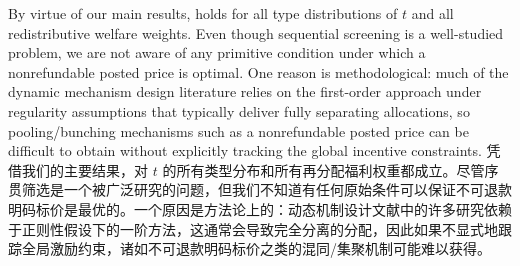 \documentclass[12pt,letterpaper]{article}
\newenvironment{original}{\color{black}\noindent}{}
\newenvironment{translation}{\color{blue}\noindent}{}
\theoremstyle{plain}
\theoremstyle{definition}
\theoremstyle{remark}
\renewcommand{\1}{\mathds{1}}
\theoremstyle{definition}
\begin{document}
\begin{original}
By virtue of our main results,  holds for all type distributions of $t$ and all redistributive welfare weights. Even though sequential screening is a well-studied problem, we are not aware of any primitive condition under which a nonrefundable posted price is optimal. One reason is methodological: much of the dynamic mechanism design literature relies on the first-order approach under regularity assumptions that typically deliver fully separating allocations, so pooling/bunching mechanisms such as a nonrefundable posted price can be difficult to obtain without explicitly tracking the global incentive constraints.
\end{original}
\begin{translation}
凭借我们的主要结果，对 $t$ 的所有类型分布和所有再分配福利权重都成立。尽管序贯筛选是一个被广泛研究的问题，但我们不知道有任何原始条件可以保证不可退款明码标价是最优的。一个原因是方法论上的：动态机制设计文献中的许多研究依赖于正则性假设下的一阶方法，这通常会导致完全分离的分配，因此如果不显式地跟踪全局激励约束，诸如不可退款明码标价之类的混同/集聚机制可能难以获得。
\end{translation}
\end{document}

